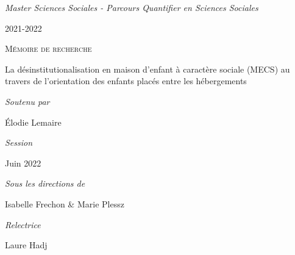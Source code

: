 \documentclass[
  12,
  a4paper,
]{report}
\author{}
\date{\vspace{-2.5em}}
\begin{document}
\begin{titlepage}

\par
{}
\hfill
{}
\par


\vspace{1cm}
\begin{center}

\normalsize{\textit{Master Sciences Sociales - Parcours Quantifier en Sciences Sociales}}

2021-2022

\vspace{5mm}

\textsc{Mémoire de recherche}

\vfill 

{\Large La désinstitutionalisation en maison d’enfant à caractère sociale (MECS) au travers de l’orientation des enfants placés entre les hébergements\par}

\vfill

{\large\itshape Soutenu par}

{\large Élodie Lemaire}

\vspace{5mm}

\textit{Session}

Juin 2022

\vspace{5mm}

\textit{Sous les directions de}

Isabelle Frechon \& Marie Plessz

\vspace{5mm}

\textit{Relectrice}

Laure Hadj

\end{center}
\end{titlepage}
\newpage
\end{document}
